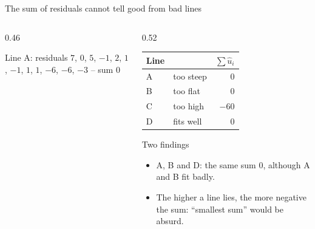 \documentclass[aspectratio=169,11pt]{beamer}
\def\storelist{1/33,3/30,4/37,5/33,6/38,8/41,8/39,9/43,10/45,11/40,12/42,13/47}
\newcommand{\storepoints}{\addplot[only marks, mark=*, mark size=2.2pt, color=hsbiblau]
  coordinates {(1,33) (3,30) (4,37) (5,33) (6,38) (8,41) (8,39) (9,43) (10,45) (11,40) (12,42) (13,47)};}
\newcommand{\residualsof}[4]{%
  \foreach \px/\py in #1 {%
    \pgfmathsetmacro{\yh}{#2 + #3*\px}%
    \edef\tmpdraw{\noexpand\draw[#4] (axis cs:\px,\py) -- (axis cs:\px,\yh);}%
    \tmpdraw
  }}
\begin{document}
\begin{frame}{The sum of residuals cannot tell good from bad lines}
  \begin{columns}[T]
    \begin{column}{0.46\textwidth}
      \begin{center}\footnotesize
        Line A: residuals $7$, $0$, $5$, $-1$, $2$, $1$, $-1$, $1$, $1$, $-6$,
        $-6$, $-3$ -- sum $0$
      \end{center}
    \end{column}
    \begin{column}{0.52\textwidth}
      \small
      \begin{center}
        \renewcommand{\arraystretch}{1.05}
        \begin{tabular}{llr}
          \toprule
          Line & & $\sum \hat{u}_i$ \\
          \midrule
          A & too steep & $0$   \\
          B & too flat  & $0$   \\
          C & too high  & $-60$ \\
          D & fits well & $0$   \\
          \bottomrule
        \end{tabular}
      \end{center}
      \begin{alertblock}{Two findings}
        \begin{itemize}
          \item A, B and D: the same sum $0$, although A and B fit badly.
          \item The higher a line lies, the more negative the sum:
                ``smallest sum'' would be absurd.
        \end{itemize}
      \end{alertblock}
    \end{column}
  \end{columns}
\end{frame}
\end{document}
